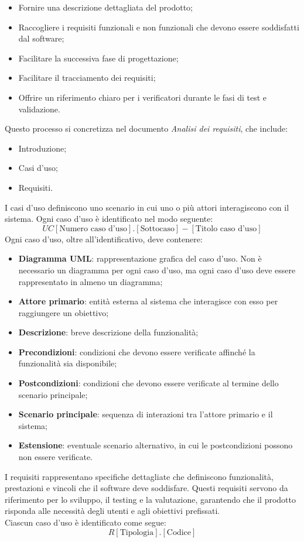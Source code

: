 \begin{itemize}
    \item Fornire una descrizione dettagliata del prodotto;
    \item Raccogliere i requisiti funzionali e non funzionali che devono essere
          soddisfatti dal software;
    \item Facilitare la successiva fase di progettazione;
    \item Facilitare il tracciamento dei requisiti;
    \item Offrire un riferimento chiaro per i verificatori durante le fasi di test e
          validazione.
\end{itemize}

Questo processo si concretizza nel documento \textit{Analisi dei requisiti},
che include:
\begin{itemize}
    \item Introduzione;
    \item Casi d'uso;
    \item Requisiti.
\end{itemize}
\label{inf:UC}
I casi d'uso definiscono uno scenario in cui uno o più attori interagiscono con il sistema. Ogni caso d'uso è
identificato nel modo seguente:
\textbf{
\[
    UC[\text{Numero caso d'uso}].[\text{Sottocaso}] - [\text{Titolo caso d'uso}]
\]
}
Ogni caso d'uso, oltre all'identificativo, deve contenere:
\begin{itemize}
    \item \textbf{Diagramma UML}: rappresentazione grafica del caso d'uso. Non è necessario un diagramma per ogni caso d'uso,
          ma ogni caso d'uso deve essere rappresentato in almeno un diagramma;
    \item \textbf{Attore primario}: entità esterna al sistema che interagisce con esso per raggiungere un obiettivo;
    \item \textbf{Descrizione}: breve descrizione della funzionalità;
    \item \textbf{Precondizioni}: condizioni che devono essere verificate affinché la funzionalità sia disponibile;
    \item \textbf{Postcondizioni}: condizioni che devono essere verificate al termine dello scenario principale;
    \item \textbf{Scenario principale}: sequenza di interazioni tra l'attore primario e il sistema;
    \item \textbf{Estensione}: eventuale scenario alternativo, in cui le postcondizioni possono non essere verificate.
\end{itemize}
\label{inf:reqs}
I requisiti rappresentano specifiche dettagliate che definiscono funzionalità, prestazioni e vincoli che il
software deve soddisfare. Questi requisiti servono da riferimento per lo sviluppo, il testing e la valutazione,
garantendo che il prodotto risponda alle necessità degli utenti e agli obiettivi prefissati.\\
Ciascun caso d'uso è identificato come segue:
\textbf{
\[
    R[\text{Tipologia}].[ \text{Codice}]
\]
}

